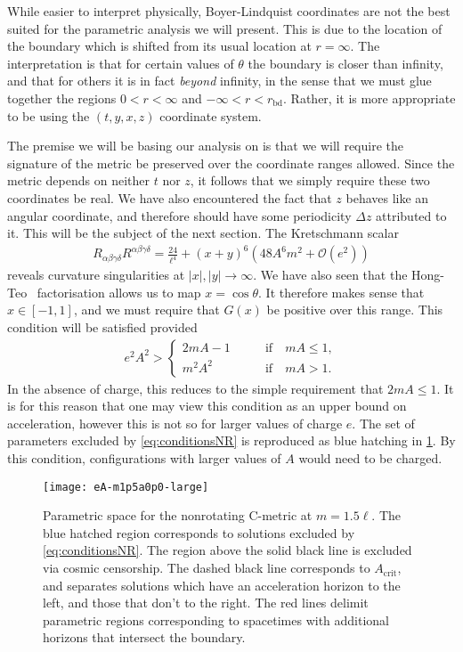 \documentclass[
twoside,
openright,
frontopenright,
]{dmathesis}
\begin{document}
While easier to interpret physically, Boyer-Lindquist coordinates are not the
best suited for the parametric analysis we will present. This is due to the
location of the boundary which is shifted from its usual location at
$r=\infty$. The interpretation is that for certain values of $\theta$ the
boundary is closer than infinity, and that for others it is in fact
\emph{beyond} infinity, in the sense that we must glue together the regions
$0<r<\infty$ and $-\infty < r < r_\mathrm{bd}$. Rather, it is more appropriate
to be using the $(t,y,x,z)$ coordinate system.

The premise we will be basing our analysis on is that we will require the
signature of the metric be preserved over the coordinate ranges allowed. Since
the metric depends on neither $t$ nor $z$, it follows that we simply require
these two coordinates be real. We have also encountered the fact that $z$
behaves like an angular coordinate, and therefore should have some periodicity
$\Delta z$ attributed to it. This will be the subject of the next section. The
Kretschmann scalar
\begin{align}
  R_{\alpha\beta\gamma\delta}R^{\alpha\beta\gamma\delta} = \frac{24}{\ell^4} +
  (x+y)^6\left(48A^6m^2+\mathcal{O}(e^2)\right)
\end{align}
reveals curvature singularities at $|x|,|y|\to\infty$. We have also seen that
the Hong-Teo~\cite{Hong:2003gx} factorisation allows us to map
$x=\cos\theta$. It therefore makes sense that $x \in [-1,1]$, and we must
require that $G(x)$ be positive over this range. This condition will be
satisfied provided
\begin{align}
  \label{eq:conditionsNR}
  e^2A^2 >
  \begin{cases}
    2mA - 1 \qquad &\mbox{if} \quad mA \leqslant 1,\\
    m^2A^2 \qquad &\mbox{if} \quad mA > 1.
  \end{cases}
\end{align}
In the absence of charge, this reduces to the simple requirement that
$2mA\leqslant 1$. It is for this reason that one may view this condition as an
upper bound on acceleration, however this is not so for larger values of charge
$e$. The set of parameters excluded by \cref{eq:conditionsNR} is reproduced as
blue hatching in \cref{fig:param-regionsNR}. By this condition, configurations
with larger values of $A$ would need to be charged.

\begin{figure}
  \centering
  \texttt{[image: eA-m1p5a0p0-large]}
  \caption{\label{fig:param-regionsNR}Parametric space for the nonrotating C-metric
    at $m=1.5\ell$. The blue hatched region corresponds to solutions excluded by
    \cref{eq:conditionsNR}. The region above the solid black line is excluded
    via cosmic censorship. The dashed black line corresponds to
    $A_\mathrm{crit}$, and separates solutions which have an acceleration
    horizon to the left, and those that don't to the right. The red lines
    delimit parametric regions corresponding to spacetimes with additional
    horizons that intersect the boundary.}
\end{figure}
\end{document}
